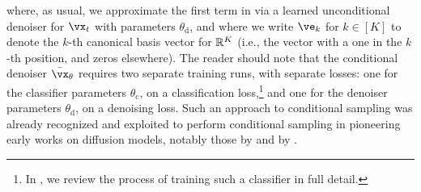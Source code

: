 \documentclass[../../book-main.tex]{subfiles}
\begin{document}
where, as usual, we approximate the first term in
 via a learned
unconditional denoiser for $\vx_t$ with parameters $\theta_{\mathrm{d}}$, and
where we write $\ve_k$ for $k \in [K]$ to denote the $k$-th canonical basis
vector for $\mathbb{R}^K$ (i.e., the vector with
a one in the $k$-th position, and zeros elsewhere).
The reader should note that the conditional denoiser $\bar{\vx}_{\theta}$
requires two separate training runs, with separate losses: one for the
classifier parameters $\theta_{\mathrm{c}}$, on a classification
loss,\footnote{In , we review the process of training such
a classifier in full detail.} and one for the denoiser parameters
$\theta_{\mathrm{d}}$, on a denoising loss. Such an approach to conditional
sampling was already recognized and exploited to perform conditional sampling in
pioneering early works on diffusion models, notably those by
\citet{Sohl-Dickstein2015} and by \citet{song2020score}.

\end{document}
